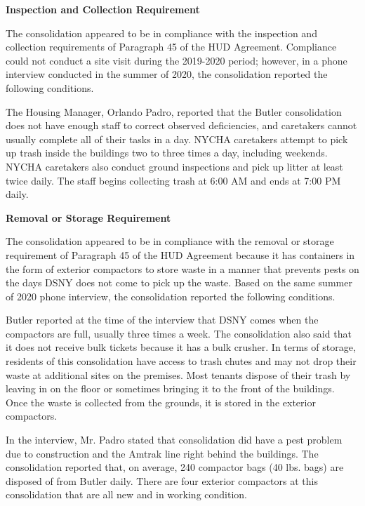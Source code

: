  

\textbf{Inspection and Collection Requirement} 

 

The consolidation appeared to be in compliance with the inspection and collection requirements of Paragraph 45 of the HUD Agreement. Compliance could not conduct a site visit during the 2019-2020 period; however, in a phone interview conducted in the summer of 2020, the consolidation reported the following conditions.

The Housing Manager, Orlando Padro, reported that the Butler consolidation does not have enough staff to correct observed deficiencies, and caretakers cannot usually complete all of their tasks in a day. NYCHA caretakers attempt to pick up trash inside the buildings two to three times a day, including weekends. NYCHA caretakers also conduct ground inspections and pick up litter at least twice daily. The staff begins collecting trash at 6:00 AM and ends at 7:00 PM daily. 

\textbf{Removal or Storage Requirement} 

The consolidation appeared to be in compliance with the removal or storage requirement of Paragraph  45 of the HUD Agreement because it has containers in the form of exterior compactors to store waste in a manner that prevents pests on the days DSNY does not come to pick up the waste. Based on the same summer of  2020  phone interview, the consolidation reported the following conditions.

 

Butler reported at the time of the interview that DSNY comes when the compactors are full, usually three times a week. The consolidation also said that it does not receive bulk tickets because it has a bulk crusher.  In terms of storage, residents of this consolidation have access to trash chutes and may not drop their waste at additional sites on the premises. Most tenants dispose of their trash by leaving in on the floor or sometimes bringing it to the front of the buildings. Once the waste is collected from the grounds, it is stored in the exterior compactors.

 

In the interview, Mr. Padro stated that consolidation did have a pest problem due to construction and the Amtrak line right behind the buildings. The consolidation reported that, on average, 240 compactor bags (40 lbs. bags)  are disposed of from Butler daily.  There are four exterior compactors at this consolidation that are all new and in working condition. 

